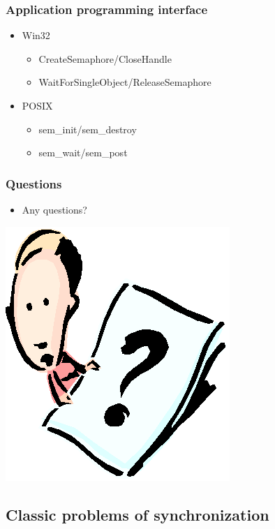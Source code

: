 \documentclass[CJKutf8,xcolor=pdftex,dvipsnames,table]{beamer}
\begin{document}
\begin{CJK*}{UTF8}{song}
  \begin{frame}
  \frametitle{Application programming interface} \pause
  \begin{itemize}
  \item{Win32} \pause
    \begin{itemize}
    \item{CreateSemaphore/CloseHandle} \pause
    \item{WaitForSingleObject/ReleaseSemaphore} \pause
    \end{itemize}
  \item{POSIX} \pause
    \begin{itemize}
    \item{sem\_init/sem\_destroy} \pause
    \item{sem\_wait/sem\_post}
    \end{itemize}
  \end{itemize}
  \end{frame}

  \begin{frame}
  \frametitle{Questions}
  \begin{itemize}
  \item{Any questions?}
  \end{itemize}
  \begin{center}
    \includegraphics[scale=.5]{question}
  \end{center}
  \end{frame}

\subsection{Classic problems of synchronization}


\end{CJK*}
\end{document}
